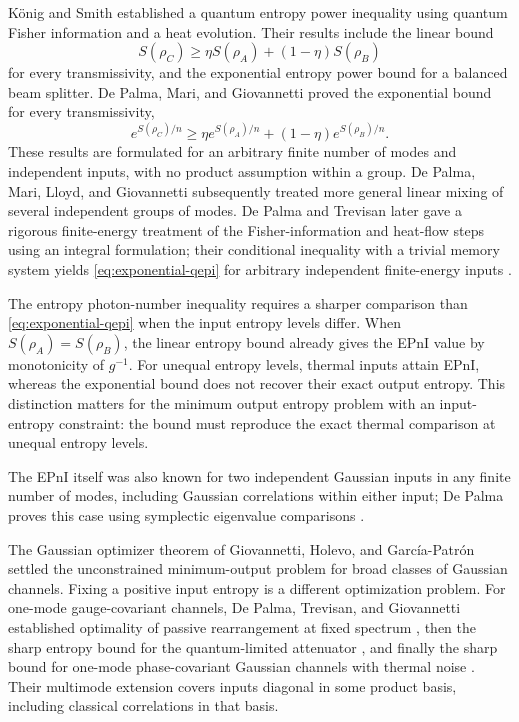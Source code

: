 K\"onig and Smith \cite{KS2014} established a quantum entropy power
inequality using quantum Fisher information and a heat evolution. Their
results include the linear bound
\[
 S(\rho_C)\ge\eta S(\rho_A)+(1-\eta)S(\rho_B)
\]
for every transmissivity, and the exponential entropy power bound for a
balanced beam splitter. De Palma, Mari, and Giovannetti \cite{DMG2014}
proved the exponential bound for every transmissivity,
\begin{equation}\label{eq:exponential-qepi}
 e^{S(\rho_C)/n}
 \ge\eta e^{S(\rho_A)/n}+(1-\eta)e^{S(\rho_B)/n}.
\end{equation}
These results are formulated for an arbitrary finite number of modes and independent
inputs, with no product assumption within a group. De Palma, Mari, Lloyd, and Giovannetti
\cite{DMLG2015} subsequently treated more general linear mixing of
several independent groups of modes.
De Palma and Trevisan later gave a rigorous finite-energy treatment of the
Fisher-information and heat-flow steps using an integral formulation;
their conditional inequality with a trivial memory system yields
\eqref{eq:exponential-qepi} for arbitrary independent finite-energy inputs
\cite[Theorem~6]{DePalmaTrevisan2018}.

The entropy photon-number inequality requires a sharper comparison than
\eqref{eq:exponential-qepi} when the input entropy levels differ. When
$S(\rho_A)=S(\rho_B)$, the linear entropy bound already gives the EPnI
value by monotonicity of $g^{-1}$. For unequal entropy levels, thermal
inputs attain EPnI, whereas the exponential bound does not recover their
exact output entropy. This distinction matters for the
minimum output entropy problem with an input-entropy constraint: the
bound must reproduce the exact thermal comparison at unequal entropy
levels.

The EPnI itself was also known for two independent Gaussian inputs in any
finite number of modes, including Gaussian correlations within either input;
De Palma proves this case using symplectic eigenvalue comparisons
\cite[Appendix~A.8]{DePalmaThesis2017}.

The Gaussian optimizer theorem of Giovannetti, Holevo, and
Garc\'ia-Patr\'on \cite{GHG2015} settled the unconstrained minimum-output
problem for broad classes of Gaussian channels. Fixing a positive input
entropy is a different optimization problem. For one-mode gauge-covariant
channels, De Palma, Trevisan, and Giovannetti established optimality of
passive rearrangement at fixed spectrum \cite{DTG2016passive}, then the
sharp entropy bound for the quantum-limited attenuator
\cite{DTG2017attenuator}, and finally the sharp bound for one-mode
phase-covariant Gaussian channels with thermal noise
\cite[Theorem~4]{DTG2017}. Their multimode extension
\cite[Theorem~11]{DTG2017multimode} covers inputs diagonal in some
product basis, including classical correlations in that basis.

